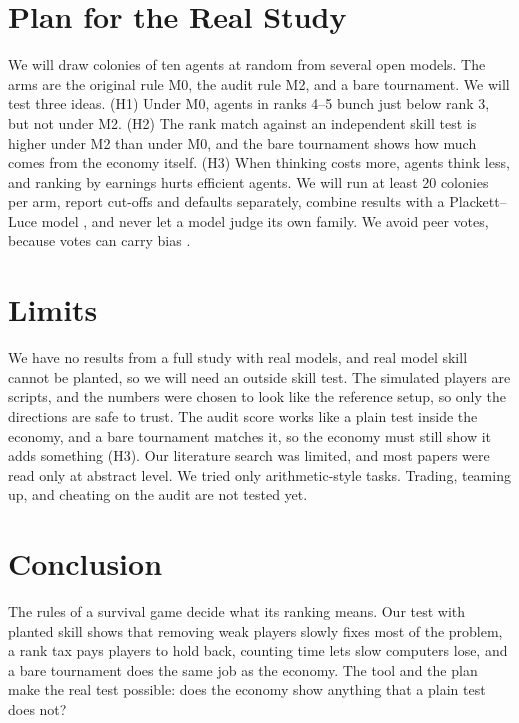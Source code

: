 \documentclass[conference]{IEEEtran}
\theoremstyle{plain}
\begin{document}
\section{Plan for the Real Study}
We will draw colonies of ten agents at random from several open models. The arms are the original rule M0, the audit rule M2, and a bare tournament. We will test three ideas. (H1) Under M0, agents in ranks 4--5 bunch just below rank 3, but not under M2. (H2) The rank match against an independent skill test is higher under M2 than under M0, and the bare tournament shows how much comes from the economy itself. (H3) When thinking costs more, agents think less, and ranking by earnings hurts efficient agents. We will run at least 20 colonies per arm, report cut-offs and defaults separately, combine results with a Plackett--Luce model \cite{murphy2026agentisland}, and never let a model judge its own family. We avoid peer votes, because votes can carry bias \cite{murphy2026agentisland}.

\section{Limits}
We have no results from a full study with real models, and real model skill cannot be planted, so we will need an outside skill test. The simulated players are scripts, and the numbers were chosen to look like the reference setup, so only the directions are safe to trust. The audit score works like a plain test inside the economy, and a bare tournament matches it, so the economy must still show it adds something (H3). Our literature search was limited, and most papers were read only at abstract level. We tried only arithmetic-style tasks. Trading, teaming up, and cheating on the audit are not tested yet.

\section{Conclusion}
The rules of a survival game decide what its ranking means. Our test with planted skill shows that removing weak players slowly fixes most of the problem, a rank tax pays players to hold back, counting time lets slow computers lose, and a bare tournament does the same job as the economy. The tool and the plan make the real test possible: does the economy show anything that a plain test does not?



\end{document}
